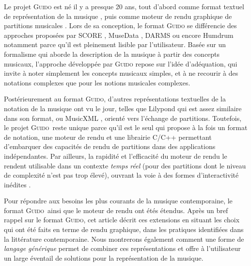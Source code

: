 \documentclass{article}
\newcommand{\guido}			{\textsc{Guido}}
\begin{document}
Le projet \guido{} est né il y a presque 20 ans, tout d'abord comme format textuel de représentation de la musique \cite{hoos98,guido}, puis comme moteur de rendu graphique de partitions musicales \cite{RENZ02}. 
Lors de sa conception, le format \guido{} se différencie des approches proposées par SCORE \cite{SCORE}, MuseData \cite{Hewlett97}, DARMS \cite{darms} ou encore Humdrum \cite{Huron97} notamment parce qu'il est pleinement lisible par l'utilisateur. Basée sur un formalisme qui aborde la description de la musique à partir des concepts musicaux, l'approche développée par \guido{} repose sur l'idée d'adéquation, qui invite à noter simplement les concepts musicaux simples, et à ne recourir à des notations complexes que pour les notions musicales complexes.

Postérieurement au format \guido, d'autres représentations textuelles de la notation de la musique ont vu le jour, telles que Lilypond \cite{lilypond03,lilypond06} qui est assez similaire dans son format, ou MusicXML \cite{good01}, orienté vers l'échange de partitions. Toutefois, le projet \guido\ reste unique parce qu'il est le seul qui propose à la fois un format de notation, une moteur de rendu et une librairie C/C++ permettant d'embarquer des capacités de rendu de partitions dans des applications indépendantes.
Par ailleurs, la rapidité et l'efficacité du moteur de rendu le rendent utilisable dans un contexte \textit{temps réel} (pour des partitions dont le niveau de complexité n'est pas trop élevé), ouvrant la voie à des formes d'interactivité inédites \cite{Hoadley12,Fober:12a}.

Pour répondre aux besoins les plus courants de la musique contemporaine, le format \guido\ ainsi que le moteur de rendu ont étés étendus. Après un bref rappel sur le format \guido, cet article décrit ces extensions en  situant les choix qui ont été faits en terme de rendu graphique, dans les pratiques identifiées dans la littérature contemporaine. Nous montrerons également comment une forme de \emph{langage générique} permet de combiner ces représentations et offre à l'utilisateur un large éventail de solutions pour la représentation de la musique.
\end{document}
